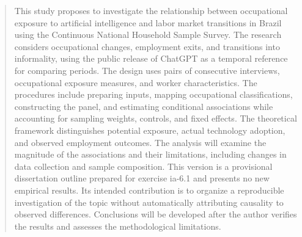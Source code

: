 \begin{abstract}
This study proposes to investigate the relationship between occupational exposure to artificial intelligence and labor market transitions in Brazil using the Continuous National Household Sample Survey. The research considers occupational changes, employment exits, and transitions into informality, using the public release of ChatGPT as a temporal reference for comparing periods. The design uses pairs of consecutive interviews, occupational exposure measures, and worker characteristics. The procedures include preparing inputs, mapping occupational classifications, constructing the panel, and estimating conditional associations while accounting for sampling weights, controls, and fixed effects. The theoretical framework distinguishes potential exposure, actual technology adoption, and observed employment outcomes. The analysis will examine the magnitude of the associations and their limitations, including changes in data collection and sample composition. This version is a provisional dissertation outline prepared for exercise ia-6.1 and presents no new empirical results. Its intended contribution is to organize a reproducible investigation of the topic without automatically attributing causality to observed differences. Conclusions will be developed after the author verifies the results and assesses the methodological limitations.
\end{abstract}